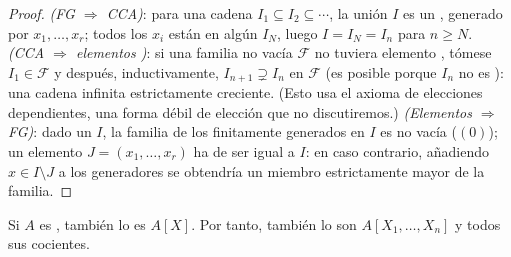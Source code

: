 \begin{proof}
\emph{(FG $\Rightarrow$ CCA)}: para una cadena $I_1 \subseteq I_2
\subseteq \cdots$, la unión $I$ es un
, generado por $x_1,
\dots, x_r$; todos los $x_i$ están en algún $I_N$, luego $I = I_N = I_n$
para $n \geq N$. \emph{(CCA $\Rightarrow$ elementos
)}: si una familia no vacía
$\mathcal F$ no tuviera elemento
, tómese $I_1 \in
\mathcal F$ y después, inductivamente, $I_{n+1} \supsetneq I_n$ en
$\mathcal F$ (es posible porque $I_n$ no es
): una cadena infinita
estrictamente creciente. (Esto usa el axioma de elecciones dependientes,
una forma débil de elección que no discutiremos.) \emph{(Elementos
 $\Rightarrow$ FG)}: dado
un  $I$, la familia de los
 finitamente generados  en
$I$ es no vacía ($(0)$); un elemento
 $J = (x_1, \dots, x_r)$ ha
de ser igual a $I$: en caso contrario, añadiendo $x \in I \setminus J$ a
los generadores se obtendría un miembro estrictamente mayor de la
familia.
\end{proof}

\begin{theorem}\label{thm:b3:rings:hilbert}
Si $A$ es , también lo es
$A[X]$. Por tanto, también lo son $A[X_1, \dots,
X_n]$ y todos sus cocientes.
\end{theorem}


